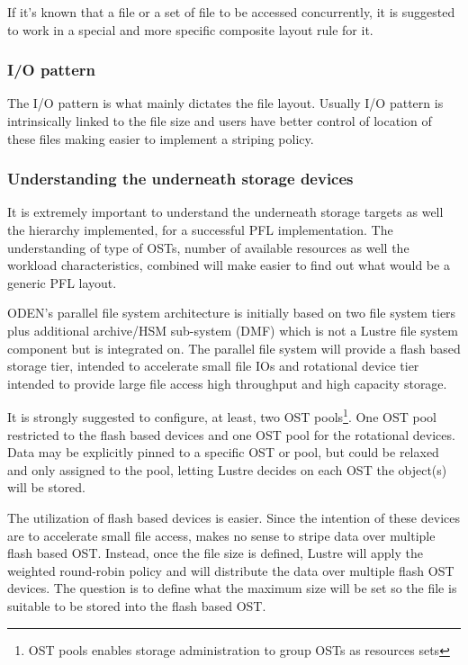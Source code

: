 \documentclass{article}
\begin{document}
If it's known that a file or a set of file to be accessed concurrently, it is suggested to work in a special and more specific composite layout rule for it. 

\subsubsection{I/O pattern}
The I/O pattern is what mainly dictates the file layout. Usually I/O pattern is intrinsically linked to the file size and users have better control of location of these files making easier to implement a striping policy. 

\subsubsection{Understanding the underneath storage devices}
It is extremely important to understand the underneath storage targets as well the hierarchy implemented, for a successful PFL implementation. The understanding of type of OSTs, number of available resources as well the workload characteristics, combined will make easier to find out what would be a generic PFL layout. 

ODEN's parallel file system architecture is initially based on two file system tiers plus additional archive/HSM sub-system (DMF) which is not a Lustre file system component but is integrated on. The parallel file system will provide a flash based storage tier, intended to accelerate small file IOs and rotational device tier intended to provide large file access high throughput and high capacity storage.

It is strongly suggested to configure, at least, two OST pools\footnote{OST pools enables storage administration to group OSTs as resources sets}. One OST pool restricted to the flash based devices and one OST pool for the rotational devices. Data may be explicitly pinned to a specific OST or pool, but could be relaxed and only assigned to the pool, letting Lustre decides on each OST the object(s) will be stored. 

The utilization of flash based devices is easier. Since the intention of these devices are to accelerate small file access, makes no sense to stripe data over multiple flash based OST. Instead, once the file size is defined, Lustre will apply the weighted round-robin policy and will distribute the data over multiple flash OST devices. The question is to define what the maximum  size will be set so the file is suitable to be stored into the flash based OST.
\end{document}
